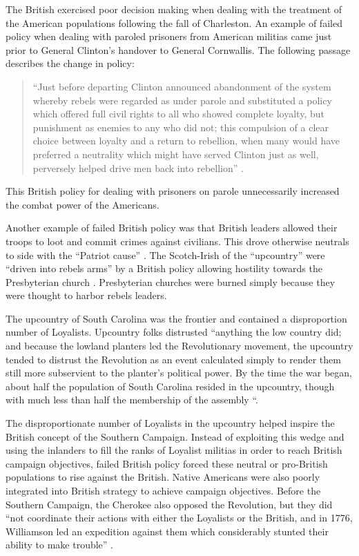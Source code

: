 The British exercised poor decision making when dealing with the treatment of
the American populations following the fall of Charleston.  An example of
failed policy when dealing with paroled prisoners from American militias came
just prior to General Clinton's handover to General Cornwallis.  The following
passage describes the change in policy: 

\begin{quote} ``Just before departing Clinton announced abandonment of the
  system whereby rebels were regarded as under parole and substituted a policy
  which offered full civil rights to all who showed complete loyalty, but
  punishment as enemies to any who did not; this compulsion of a clear choice
  between loyalty and a return to rebellion, when many would have preferred a
  neutrality which might have served Clinton just as well, perversely helped
  drive men back into rebellion'' \cite[12]{weigley_partisan_1970}. 
\end{quote}

This British policy for dealing with prisoners on parole unnecessarily
increased the combat power of the Americans.  

Another example of failed British policy was that British leaders allowed their
troops to loot and commit crimes against civilians.  This drove otherwise
neutrals to side with the ``Patriot cause'' \cite[13]{weigley_partisan_1970}.
The Scotch-Irish of the ``upcountry'' were ``driven into rebels arms'' by a
British policy allowing hostility towards the Presbyterian church
\cite[13]{weigley_partisan_1970}.  Presbyterian churches were burned simply
because they were thought to harbor rebels leaders. 

The upcountry of South Carolina was the frontier and contained a disproportion
number of Loyalists.  Upcountry folks distrusted ``anything the low country
did; and because the lowland planters led the Revolutionary movement, the
upcountry tended to distrust the Revolution as an event calculated simply to
render them still more subservient to the planter's political power.  By the
time the war began, about half the population of South Carolina resided in the
upcountry, though with much less than half the membership of the assembly
``\cite[11]{weigley_partisan_1970}.

The disproportionate number of Loyalists in the upcountry helped inspire the
British concept of the Southern Campaign.  Instead of exploiting this wedge and
using the inlanders to fill the ranks of Loyalist militias in order to reach
British campaign objectives, failed British policy forced these neutral or
pro-British populations to rise against the British.  Native Americans were
also poorly integrated into British strategy to achieve campaign objectives.
Before the Southern Campaign, the Cherokee also opposed the Revolution, but
they did ``not coordinate their actions with either the Loyalists or the
British, and in 1776, Williamson led an expedition against them which
considerably stunted their ability to make trouble''
\cite[12]{weigley_partisan_1970}.

